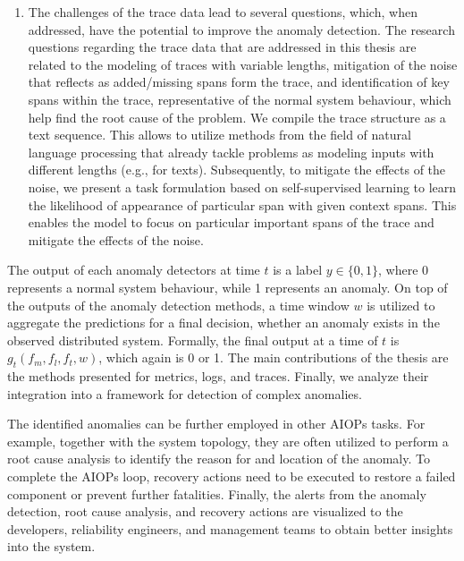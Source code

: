 \begin{enumerate}
    \item The challenges of the trace data lead to several questions, which, when addressed, have the potential to improve the anomaly detection. The research questions regarding the trace data that are addressed in this thesis are related to the modeling of traces with variable lengths, mitigation of the noise that reflects as added/missing spans form the trace, and identification of key spans within the trace, representative of the normal system behaviour, which help find the root cause of the problem. We compile the trace structure as a text sequence. This allows to utilize methods from the field of natural language processing that already tackle problems as modeling inputs with different lengths (e.g., for texts). Subsequently, to mitigate the effects of the noise, we present a task formulation based on self-supervised learning to learn the likelihood of appearance of particular span with given context spans. This enables the model to focus on particular important spans of the trace and mitigate the effects of the noise. 
\end{enumerate}

The output of each anomaly detectors at time $t$ is a label $y\in\{0,1\}$, where 0 represents a normal system behaviour, while 1 represents an anomaly.
On top of the outputs of the anomaly detection methods, a time window $w$ is utilized to aggregate the predictions for a final decision, whether an anomaly exists in the observed distributed system. Formally, the final output at a time of $t$ is $g_t(f_m, f_l, f_t, w)$, which again is 0 or 1. The main contributions of the thesis are the methods presented for metrics, logs, and traces. Finally, we analyze their integration into a framework for detection of complex anomalies.

The identified anomalies can be further employed in other AIOPs tasks. For example, together with the system topology, they are often utilized to perform a root cause analysis to identify the reason for and location of the anomaly. To complete the AIOPs loop, recovery actions need to be executed to restore a failed component or prevent further fatalities. Finally, the alerts from the anomaly detection, root cause analysis, and recovery actions are visualized to the developers, reliability engineers, and management teams to obtain better insights into the system. 
